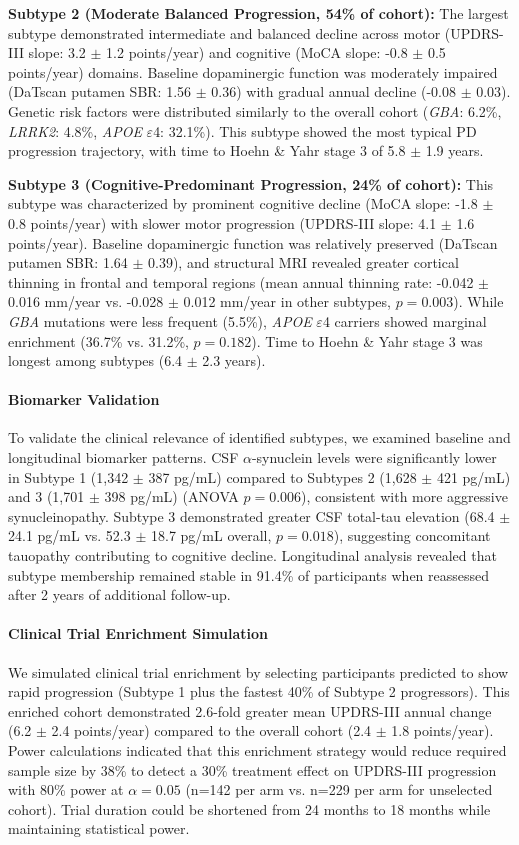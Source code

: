 \textbf{Subtype 2 (Moderate Balanced Progression, 54\% of cohort):} The largest subtype demonstrated intermediate and balanced decline across motor (UPDRS-III slope: 3.2 $\pm$ 1.2 points/year) and cognitive (MoCA slope: -0.8 $\pm$ 0.5 points/year) domains. Baseline dopaminergic function was moderately impaired (DaTscan putamen SBR: 1.56 $\pm$ 0.36) with gradual annual decline (-0.08 $\pm$ 0.03). Genetic risk factors were distributed similarly to the overall cohort (\textit{GBA}: 6.2\%, \textit{LRRK2}: 4.8\%, \textit{APOE} $\varepsilon$4: 32.1\%). This subtype showed the most typical PD progression trajectory, with time to Hoehn \& Yahr stage 3 of 5.8 $\pm$ 1.9 years.

\textbf{Subtype 3 (Cognitive-Predominant Progression, 24\% of cohort):} This subtype was characterized by prominent cognitive decline (MoCA slope: -1.8 $\pm$ 0.8 points/year) with slower motor progression (UPDRS-III slope: 4.1 $\pm$ 1.6 points/year). Baseline dopaminergic function was relatively preserved (DaTscan putamen SBR: 1.64 $\pm$ 0.39), and structural MRI revealed greater cortical thinning in frontal and temporal regions (mean annual thinning rate: -0.042 $\pm$ 0.016 mm/year vs. -0.028 $\pm$ 0.012 mm/year in other subtypes, $p = 0.003$). While \textit{GBA} mutations were less frequent (5.5\%), \textit{APOE} $\varepsilon$4 carriers showed marginal enrichment (36.7\% vs. 31.2\%, $p = 0.182$). Time to Hoehn \& Yahr stage 3 was longest among subtypes (6.4 $\pm$ 2.3 years).

\paragraph{Biomarker Validation}
To validate the clinical relevance of identified subtypes, we examined baseline and longitudinal biomarker patterns. CSF $\alpha$-synuclein levels were significantly lower in Subtype 1 (1,342 $\pm$ 387 pg/mL) compared to Subtypes 2 (1,628 $\pm$ 421 pg/mL) and 3 (1,701 $\pm$ 398 pg/mL) (ANOVA $p = 0.006$), consistent with more aggressive synucleinopathy. Subtype 3 demonstrated greater CSF total-tau elevation (68.4 $\pm$ 24.1 pg/mL vs. 52.3 $\pm$ 18.7 pg/mL overall, $p = 0.018$), suggesting concomitant tauopathy contributing to cognitive decline. Longitudinal analysis revealed that subtype membership remained stable in 91.4\% of participants when reassessed after 2 years of additional follow-up.

\paragraph{Clinical Trial Enrichment Simulation}
We simulated clinical trial enrichment by selecting participants predicted to show rapid progression (Subtype 1 plus the fastest 40\% of Subtype 2 progressors). This enriched cohort demonstrated 2.6-fold greater mean UPDRS-III annual change (6.2 $\pm$ 2.4 points/year) compared to the overall cohort (2.4 $\pm$ 1.8 points/year). Power calculations indicated that this enrichment strategy would reduce required sample size by 38\% to detect a 30\% treatment effect on UPDRS-III progression with 80\% power at $\alpha = 0.05$ (n=142 per arm vs. n=229 per arm for unselected cohort). Trial duration could be shortened from 24 months to 18 months while maintaining statistical power.

